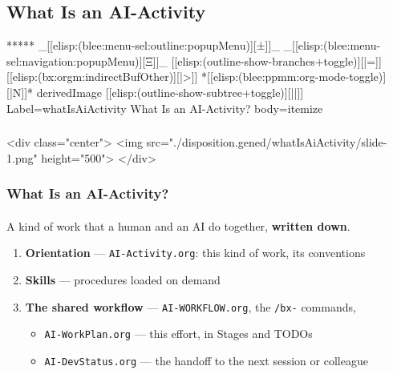 \begin{whenOrg}
\section{What Is an AI-Activity}

\begin{whenOrg}
*****  _[[elisp:(blee:menu-sel:outline:popupMenu)][±]]_ _[[elisp:(blee:menu-sel:navigation:popupMenu)][Ξ]]_ [[elisp:(outline-show-branches+toggle)][|=]] [[elisp:(bx:orgm:indirectBufOther)][|>]] *[[elisp:(blee:ppmm:org-mode-toggle)][|N]]*  derivedImage [[elisp:(outline-show-subtree+toggle)][||]] Label=whatIsAiActivity What Is an AI-Activity? body=itemize
\end{whenOrg}

\begin{htmlonly}

\begin{frame}[fragile,plain,label=whatIsAiActivity]
    \frametitle{}
    \framesubtitle{}
    \begin{rawhtml}
<div class="center">
<img src="./disposition.gened/whatIsAiActivity/slide-1.png" height="500">
</div>
    \end{rawhtml}
\end{frame}
\end{htmlonly}

\begin{verblatex}

\begin{frame}[fragile,plain,label=whatIsAiActivity]
    \frametitle{What Is an AI-Activity?}
    \framesubtitle{}

A kind of work that a human and an AI do together, \textbf{written down}.

  \begin{enumerate}
  \item \textbf{Orientation} --- \texttt{AI-Activity.org}: this kind of work, its conventions
  \item \textbf{Skills} --- procedures loaded on demand
  \item \textbf{The shared workflow} --- \texttt{AI-WORKFLOW.org}, the \texttt{/bx-} commands,
    \begin{itemize}
    \item \texttt{AI-WorkPlan.org} --- this effort, in Stages and TODOs
    \item \texttt{AI-DevStatus.org} --- the handoff to the next session or colleague
    \end{itemize}
  \end{enumerate}


\end{frame}
\end{verblatex}
\end{whenOrg}
